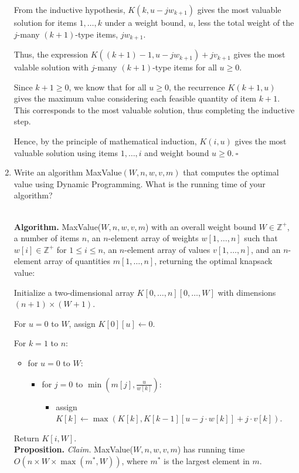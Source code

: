 \begin{enumerate}
\begin{solution}
From the inductive hypothesis, $K(k,u-jw_{k+1})$ gives the most valuable solution for items $1,\dots,k$ under a weight bound, $u$, less the total weight of the $j$-many $(k+1)$-type items, $jw_{k+1}$.

Thus, the expression $K((k+1)-1,u-jw_{k+1})+jv_{k+1}$ gives the most valable solution with $j$-many $(k+1)$-type items for all $u\geq 0$.

Since $k+1\geq 0$, we know that for all $u\geq 0$, the recurrence $K(k+1,u)$ gives the maximum value considering each feasible quantity of item $k+1$. This corresponds to the most valuable solution, thus completing the inductive step.

Hence, by the principle of mathematical induction, $K(i,u)$ gives the most valuable solution using items $1,\dots,i$ and weight bound $u\geq 0$.$~\square$
\end{solution}
\item Write an algorithm {\sc MaxValue}$(W,n,w,v,m)$ that computes the optimal value using Dynamic Programming. What is the running time of your algorithm?
\begin{solution}\\

\textbf{Algorithm. }{\sc MaxValue}($W,n,w,v,m$) with an overall weight bound $W\in\mathbb{Z}^+$, a number of items $n$, an $n$-element array of weights $w[1,\dots,n]$ such that $w[i]\in\mathbb{Z}^+$ for $1\leq i\leq n$, an $n$-element array of values $v[1,\dots,n]$, and an $n$-element array of quantities $m[1,\dots,n]$, returning the optimal knapsack value:

Initialize a two-dimensional array $K[0,\dots,n][0,\dots,W]$ with dimensions $(n+1)\times(W+1)$.

For $u=0$ to $W$, assign $K[0][u]\leftarrow 0$.

For $k=1$ to $n$:
\begin{itemize}
\item for $u=0$ to $W$:
\begin{itemize}
\item for $j=0$ to $\min\left(m[j],\frac{u}{w[k]}\right)$:
\begin{itemize}
\item assign $K[k]\leftarrow\max(K[k],K[k-1][u-j\cdot w[k]]+j\cdot v[k])$.
\end{itemize}
\end{itemize}
\end{itemize}
Return $K[i,W]$.\\

\textbf{Proposition. }\textit{Claim. }{\sc MaxValue}($W,n,w,v,m$) has running time $O(n\times W\times\max(m^*,W))$, where $m^*$ is the largest element in $m$.


\end{solution}
\end{enumerate}
